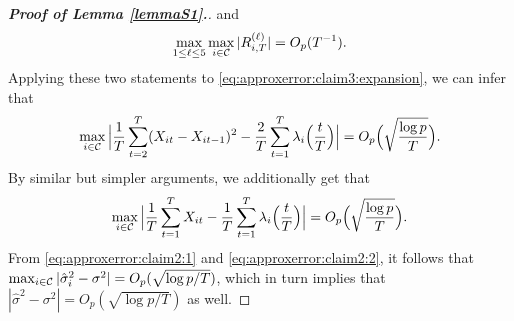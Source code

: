 \documentclass[a4paper,12pt]{article}
\numberwithin{equation}{section}
\begin{document}
\begin{proof}[\textnormal{\textbf{Proof of Lemma \ref{lemmaS1}.}}]
and 
\[ \max_{1 \le \ell \le 5} \max_{i \in \mathcal{C}} |R_{i,T}^{(\ell)}| = O_p(T^{-1}). \]
Applying these two statements to \eqref{eq:approxerror:claim3:expansion}, we can infer that
\begin{equation}\label{eq:approxerror:claim2:1}
\max_{i \in \mathcal{C}} \Big| \frac{1}{T} \sum\limits_{t=2}^T (X_{it} - X_{it-1})^2 - \frac{2}{T} \sum\limits_{t=1}^T \lambda_i\Big(\frac{t}{T}\Big) \Big| = O_p\Big( \sqrt{\frac{\log p}{T}} \Big). 
\end{equation}
By similar but simpler arguments, we additionally get that 
\begin{equation}\label{eq:approxerror:claim2:2}
\max_{i \in \mathcal{C}} \Big| \frac{1}{T} \sum\limits_{t=1}^T X_{it} - \frac{1}{T} \sum\limits_{t=1}^T \lambda_i\Big(\frac{t}{T}\Big) \Big| = O_p\Big( \sqrt{\frac{\log p}{T}} \Big). 
\end{equation}
From \eqref{eq:approxerror:claim2:1} and \eqref{eq:approxerror:claim2:2}, it follows that $\max_{i \in \mathcal{C}} |\hat{\sigma}_i^2 - \sigma^2| = O_p(\sqrt{\log p / T})$, which in turn implies that $|\hat{\sigma}^2 - \sigma^2| = O_p(\sqrt{\log p / T})$ as well. 
\end{proof} 
\end{document}
